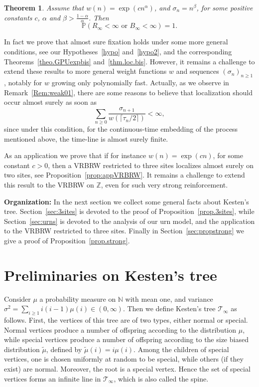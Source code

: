 \documentclass[10pt,a4paper]{amsart}
\newtheorem {theo} {Theorem} [section]
\newcommand{\1}{{\text{\Large $\mathfrak 1$}}}
\begin{document}
\begin{theo}\label{thm:GPUexp}
Assume that $w(n) = \exp(cn^\alpha)$, and $\sigma_n = n^\beta$, for some positive constants $c$, $\alpha$ and $\beta> \frac{1-\alpha}{\alpha}$. Then 
$$  \mathbb P(R_\infty <\infty\textrm{ or }B_\infty<\infty) = 1. $$ 
\end{theo}
In fact we prove that almost sure fixation holds under some more general conditions, see our Hypotheses~\ref{hypo} and~\ref{hypo2}, and the corresponding Theorems~\ref{theo.GPUexpbis} and~\ref{thm.loc.bis}.  
However, it remains a challenge to extend these results to more general weight functions $w$ and sequences $(\sigma_n)_{n\ge 1}$, notably for $w$ growing only polynomially fast. 
Actually, as we observe in Remark~\ref{Rem:weak01}, there are some reasons to believe that localization should occur almost surely as soon as 
$$\sum_{n\ge 0} \frac{\sigma_{n+1}}{w(\lceil \tau_n/2\rceil)} <\infty,$$
since under this condition, for the continuous-time embedding of the process mentioned above, the time-line is almost surely finite.  


As an application we prove that if for instance $w(n) = \exp(cn)$, for some constant $c>0$, then a VRBRW restricted to three sites localizes almost surely on two sites, see Proposition~\ref{prop:appVRBRW}. 
It remains a challenge to extend this result to the VRBRW on $\mathbb Z$, even for such very strong reinforcement. 

\vspace{0.2cm}
\textbf{Organization:} In the next section we collect some general facts about Kesten's tree. Section~\ref{sec:3sites} is devoted to the proof of Proposition~\ref{prop.3sites}, while Section~\ref{sec:urns} is devoted to the analysis of our urn model, and the application to the VRBRW restricted to three sites. 
Finally in Section~\ref{sec:propstrong} we give a proof of Proposition~\ref{prop.strong}. 


\section{Preliminaries on Kesten's tree}\label{sec.Kesten}
Consider $\mu$ a probability measure on $\mathbb N$ with mean one, and variance $\sigma^2= \sum_{i\ge 1} i(i-1)\mu(i)\in (0,\infty)$. Then we define Kesten's tree $\mathcal T_\infty$ as follows. First, the vertices of this tree are of two types, either normal or special. Normal vertices produce a number of offspring according to the distribution $\mu$, while special vertices produce a number of offspring according to the size biased distribution $\widetilde \mu$, defined by $\widetilde \mu(i ) = i\mu(i)$. Among the children of special vertices, one is chosen uniformly at random to be special, while others (if they exist) are normal. Moreover, the root is a special vertex. Hence the set of special vertices forms an infinite line in $\mathcal T_\infty$, which is also called the spine. 
 
\end{document}
